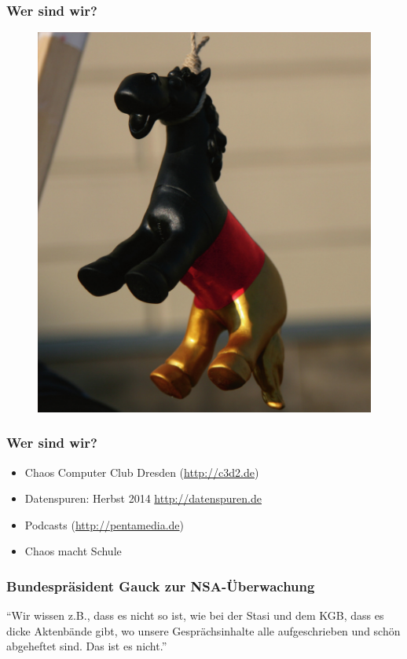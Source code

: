 \documentclass[12pt]{beamer}
\begin{document}
\begin{frame}
  \frametitle{Wer sind wir?}
  \begin{figure}
    \includegraphics[height=0.7\textheight]{img/trojaner.jpg}
  \end{figure}
\end{frame}

\begin{frame}
    \frametitle{Wer sind wir?}
    \begin{itemize}
      \item<1-> Chaos Computer Club Dresden (\url{http://c3d2.de})
          \note{}
      \item<2-> Datenspuren: Herbst 2014 \url{http://datenspuren.de}
      \item<3-> Podcasts (\url{http://pentamedia.de})
      \item<4-> Chaos macht Schule
    \end{itemize}
\end{frame}

\begin{frame}
    \frametitle{Bundespräsident Gauck zur NSA-Überwachung}
    \begin{center}
      "`Wir wissen z.B., dass es nicht so ist, wie bei der Stasi und dem KGB, dass es dicke Aktenbände gibt, wo unsere Gesprächsinhalte alle aufgeschrieben und schön abgeheftet sind. Das ist es nicht."'
      \end{center}
\end{frame}
\end{document}
